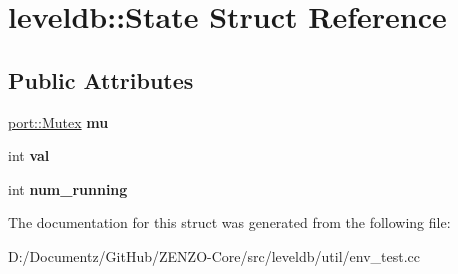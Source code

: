 \hypertarget{structleveldb_1_1_state}{}\section{leveldb\+::State Struct Reference}
\label{structleveldb_1_1_state}
\subsection*{Public Attributes}
\begin{DoxyCompactItemize}
\item 
\mbox{\label{structleveldb_1_1_state_aa5b0e460a6a87debeb211c47dce8ddd3}} 
\mbox{\hyperlink{classleveldb_1_1port_1_1_mutex}{port\+::\+Mutex}} {\bfseries mu}
\item 
\mbox{\label{structleveldb_1_1_state_adfc3479f732e7396e735991e48963981}} 
int {\bfseries val}
\item 
\mbox{\label{structleveldb_1_1_state_a6e84d8550d17c6c3edda2e114a634e61}} 
int {\bfseries num\+\_\+running}
\end{DoxyCompactItemize}


The documentation for this struct was generated from the following file\+:\begin{DoxyCompactItemize}
\item 
D\+:/\+Documentz/\+Git\+Hub/\+Z\+E\+N\+Z\+O-\/\+Core/src/leveldb/util/env\+\_\+test.\+cc\end{DoxyCompactItemize}
